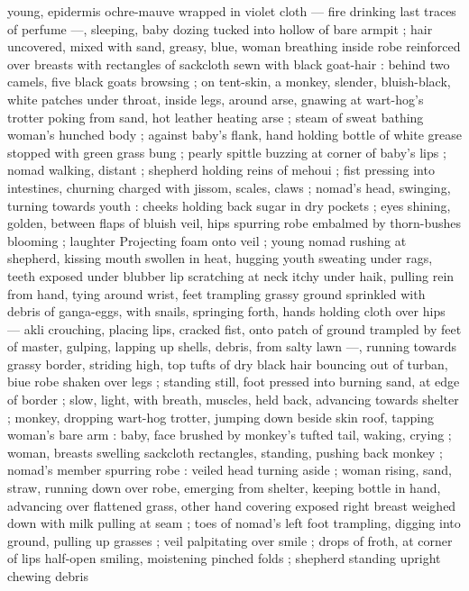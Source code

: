 {young, epidermis ochre-mauve wrapped in violet cloth --- fire 
drinking last traces of perfume ---, sleeping, baby dozing tucked into 
hollow of bare armpit ; hair uncovered, mixed with sand, greasy, 
blue, woman breathing inside robe reinforced over breasts with 
rectangles of sackcloth sewn with black goat-hair : behind two 
camels, five black goats browsing ; on tent-skin, a monkey, slender, 
bluish-black, white patches under throat, inside legs, around arse, 
gnawing at wart-hog's trotter poking from sand, hot leather heating 
arse ; steam of sweat bathing woman's hunched body ; against 
baby's flank, hand holding bottle of white grease stopped with green 
grass bung ; pearly spittle buzzing at corner of baby's lips ; nomad 
walking, distant ; shepherd holding reins of mehoui ; fist pressing 
into intestines, churning charged with jissom, scales, claws ; nomad's 
head, swinging, turning towards youth : cheeks holding back sugar 
in dry pockets ; eyes shining, golden, between flaps of bluish veil, 
hips spurring robe embalmed by thorn-bushes blooming ; laughter 
Projecting foam onto veil ; young nomad rushing at shepherd, kissing 
mouth swollen in heat, hugging youth sweating under rags, teeth 
exposed under blubber lip scratching at neck itchy under haik, 
pulling rein from hand, tying around wrist, feet trampling grassy 
ground sprinkled with debris of ganga-eggs, with snails, springing 
forth, hands holding cloth over hips --- akli crouching, placing lips, 
cracked fist, onto patch of ground trampled by feet of master, 
gulping, lapping up shells, debris, from salty lawn ---, running 
towards grassy border, striding high, top tufts of dry black hair 
bouncing out of turban, biue robe shaken over legs ; standing still, 
foot pressed into burning sand, at edge of border ; slow, light, with 
breath, muscles, held back, advancing towards shelter ; monkey, 
dropping wart-hog trotter, jumping down beside skin roof, tapping 
woman's bare arm : baby, face brushed by monkey's tufted tail, 
waking, crying ; woman, breasts swelling sackcloth rectangles, 
standing, pushing back monkey ; nomad's member spurring robe : 
veiled head turning aside ; woman rising, sand, straw, running down 
over robe, emerging from shelter, keeping bottle in hand, advancing 
over flattened grass, other hand covering exposed right breast 
weighed down with milk pulling at seam ; toes of nomad's left foot 
trampling, digging into ground, pulling up grasses ; veil palpitating 
over smile ; drops of froth, at corner of lips half-open smiling, 
moistening pinched folds ; shepherd standing upright chewing debris 
}
